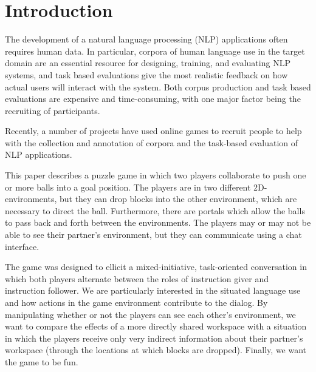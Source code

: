 
\section{Introduction}

The development of a natural language processing (NLP) applications often
requires human data. In particular, corpora of human language use in
the target domain are an essential resource for designing, training,
and evaluating NLP systems, and task based evaluations give the most
realistic feedback on how actual users will interact with the
system. Both corpus production and task based evaluations are
expensive and time-consuming, with one major factor being the
recruiting of participants.

Recently, a number of projects have used online games to recruit
people to help with the collection and annotation of corpora and the
task-based evaluation of NLP applications.

This paper describes a puzzle game in which two players collaborate to
push one or more balls into a goal position. The players are in two
different 2D-environments, but they can drop blocks into the other
environment, which are necessary to direct the ball. Furthermore,
there are portals which allow the balls to pass back and forth between
the environments. The players may or may not be able to see their
partner's environment, but they can communicate using a chat
interface.

The game was designed to ellicit a mixed-initiative, task-oriented
conversation in which both players alternate between the roles of
instruction giver and instruction follower. We are particularly
interested in the situated language use and how actions in the game
environment contribute to the dialog.  By manipulating whether or not
the players can see each other's environment, we want to compare the
effects of a more directly shared workspace with a situation in which
the players receive only very indirect information about their
partner's workspace (through the locations at which blocks are
dropped). Finally, we want the game to be fun. 

